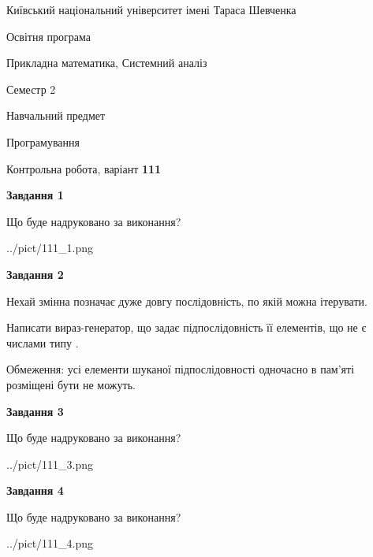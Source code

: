 \documentclass[12pt, ukrainian]{article}
\begin{document}
{{\begin {small}\par
{ \center  Київський національний університет імені Тараса Шевченка \par}
{\parbox {5 cm}{Освітня програма \hfill}{\parbox {8 cm}{Прикладна математика, Системний аналіз \hfill}}\parbox {5 cm}{\hfill Семестр 2}}\par
{\parbox {5 cm} {Навчальний предмет \hfill}\parbox {7 cm}{Програмування \hfill}\parbox {6cm}{\hfill}\par}\vspace{-7pt} \end{small}}{\center Контрольна робота, варіант  \No \textbf
{ 111 }\par}}
{
\begin {large}
{\begin {center}\textbf{Завдання 1}\end {center}}\par
Що буде надруковано за виконання?\par\par
\begin{center}
	{../pict/111_1.png}
\end{center}
\newpage

{\begin {center}\textbf{Завдання 2}\end {center}}\par
Нехай змінна  позначає дуже довгу послідовність, по якій можна ітерувати.

Написати вираз-генератор, що задає підпослідовність її елементів, що не є числами типу .

Обмеження: усі елементи шуканої підпослідовності одночасно в пам'яті розміщені бути не можуть.\par
\newpage

{\begin {center}\textbf{Завдання 3}\end {center}}\par
Що буде надруковано за виконання?
\begin{center}
	{../pict/111_3.png}
\end{center}
\newpage

{\begin {center}\textbf{Завдання 4}\end {center}}\par
Що буде надруковано за виконання?\par
\begin{center}
	{../pict/111_4.png}
\end{center}
\newpage


\end{large}}
\end{document}
